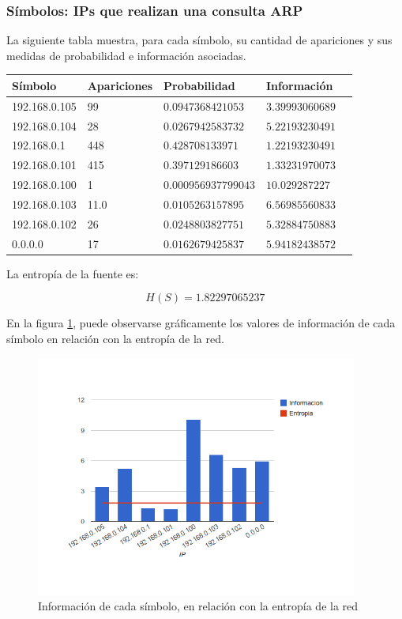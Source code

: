 \documentclass{article}
\begin{document}
\subsubsection{Símbolos: IPs que realizan una consulta ARP}
La siguiente tabla muestra, para cada símbolo, su cantidad de apariciones y
sus medidas de probabilidad e información asociadas.

\vskip10pt

\begin{tabular}{|l|l|l|l|l|}
  \hline
  Símbolo & Apariciones & Probabilidad & Información \\
  \hline
  192.168.0.105 & 99 & $0.0947368421053$ & $3.39993060689$ \\
  \hline
  192.168.0.104 & 28 & $0.0267942583732$ & $5.22193230491$ \\
  \hline
  192.168.0.1 & 448 & $0.428708133971$ & $1.22193230491$ \\
  \hline
  192.168.0.101 & 415 & $0.397129186603$  & $1.33231970073$ \\
  \hline
  192.168.0.100 & 1 & $0.000956937799043$ & $10.029287227$ \\
  \hline
  192.168.0.103 & 11.0 & $0.0105263157895$ & $6.56985560833$ \\
  \hline
  192.168.0.102 & 26 & $0.0248803827751$ & $5.32884750883$ \\
  \hline
  0.0.0.0 & 17 & $0.0162679425837$ & $5.94182438572$ \\
  \hline
\end{tabular}

\vskip10pt

La entropía de la fuente es:

$$H(S) = 1.82297065237$$

En la figura \ref{fig:red1requesters:infoentro}, puede observarse gráficamente
los valores de información de cada símbolo en relación con la entropía de la
red.

\begin{figure}[h!]
    \centering                                                       
    \includegraphics[width=300pt]{consultas1.png}
    \caption{Información de cada símbolo, en relación con la
        entropía de la red}
    \label{fig:red1requesters:infoentro}
\end{figure}
\end{document}
